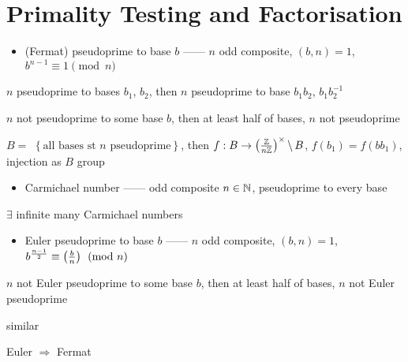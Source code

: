 \section{Primality Testing and Factorisation}\label{sec:primality-testing-and-factorisation}

\begin{itemize}
    \item (Fermat) pseudoprime to base $b$ ------ $n$ odd composite, $(b, n) = 1$, $b^{n-1} \equiv 1 \pmod{n}$
\end{itemize}

\begin{lemma}
    $n$ pseudoprime to bases $b_1$, $b_2$, then $n$ pseudoprime to base $b_1 b_2$, $b_1 b_2^{-1}$
\end{lemma}

\begin{prop}
    $n$ not pseudoprime to some base $b$, then at least half of bases, $n$ not pseudoprime
\end{prop}
\begin{pf}
    $B = $ $\left\{ \text{all bases st } n \text{ pseudoprime} \right\}$, then $f : B \rightarrow \left( \frac{\mathbb{Z}}{n\mathbb{Z}} \right)^\times \backslash \, B$,
    $f(b_1) = f(b b_1)$, injection as $B$ group
\end{pf}

\begin{itemize}
    \item Carmichael number ------ odd composite $n \in \mathbb{N}$, pseudoprime to every base
\end{itemize}

\begin{fact}
    $\exists$ infinite many Carmichael numbers
\end{fact}

\begin{itemize}
    \item Euler pseudoprime to base $b$ ------ $n$ odd composite, $(b, n) = 1$, $b^{\frac{n-1}{2}} \equiv \left( \frac{b}{n} \right) \pmod{n}$
\end{itemize}

\begin{prop}
    $n$ not Euler pseudoprime to some base $b$, then at least half of bases, $n$ not Euler pseudoprime
\end{prop}
\begin{pf}
    similar
\end{pf}

\begin{fact}
    Euler $\Rightarrow$ Fermat
\end{fact}

